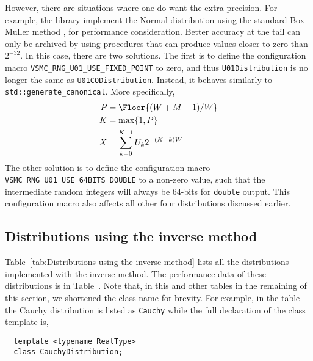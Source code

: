 However, there are situations where one do want the extra precision. For
example, the library implement the Normal distribution using the standard
Box-Muller method \parencite{Box:1958hv}, for performance consideration. Better
accuracy at the tail can only be archived by using procedures that can produce
values closer to zero than $2^{-32}$. In this case, there are two solutions.
The first is to define the configuration macro
\verb|VSMC_RNG_U01_USE_FIXED_POINT| to zero, and thus \verb|U01Distribution| is
no longer the same as \verb|U01CODistribution|. Instead, it behaves similarly
to \verb|std::generate_canonical|. More specifically,
\begin{align*}
  P &= \Floor{(W + M - 1) / W} \\
  K &= \max\{1, P\} \\
  X &= \sum_{k=0}^{K - 1} U_k 2^{-(K - k)W}
\end{align*}
The other solution is to define the configuration macro
\verb|VSMC_RNG_U01_USE_64BITS_DOUBLE| to a non-zero value, such that the
intermediate random integers will always be 64-bits for \verb|double| output.
This configuration macro also affects all other four distributions discussed
earlier.

\subsection{Distributions using the inverse method}
\label{sub:Distributions using the inverse method}

Table~\ref{tab:Distributions using the inverse method} lists all the
distributions implemented with the inverse method. The performance data of
these distributions is in Table~. Note that, in this and other tables in the remaining of
this section, we shortened the class name for brevity. For example, in the
table the Cauchy distribution is listed as \verb|Cauchy| while the full
declaration of the class template is,
\begin{Verbatim}
  template <typename RealType>
  class CauchyDistribution;
\end{Verbatim}

